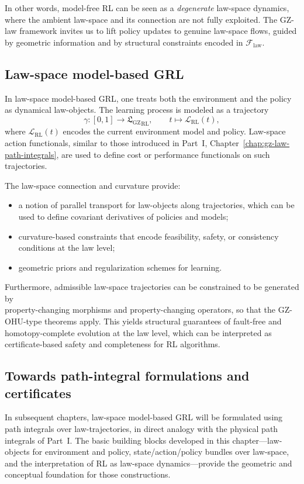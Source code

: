 \documentclass[11pt]{book}
\newcommand{\GZLS}{\ensuremath{\mathfrak{L}_{\mathrm{GZ}}}}
\newcommand{\GZLCurv}{\ensuremath{\mathcal{F}_{\mathrm{law}}}}
\theoremstyle{plain}
\theoremstyle{definition}
\theoremstyle{remark}
\begin{document}
In other words, model-free RL can be seen as a \emph{degenerate}
law-space dynamics, where the ambient law-space and its connection
are not fully exploited. The GZ-law framework invites us to lift
policy updates to genuine law-space flows, guided by geometric
information and by structural constraints encoded in $\GZLCurv$.

\subsection*{Law-space model-based GRL}

In law-space model-based GRL, one treats both the environment and
the policy as dynamical law-objects. The learning process is modeled
as a trajectory
\[
   \gamma \colon [0,1] \longrightarrow {\GZLS}_{\mathrm{RL}},
   \qquad t \longmapsto \mathcal{L}_{\mathrm{RL}}(t),
\]
where $\mathcal{L}_{\mathrm{RL}}(t)$ encodes the current environment
model and policy. Law-space action functionals, similar to those
introduced in Part~I, Chapter~\ref{chap:gz-law-path-integrals}, are
used to define cost or performance functionals on such trajectories.

The law-space connection and curvature provide:
\begin{itemize}
  \item a notion of parallel transport for law-objects along
        trajectories, which can be used to define covariant
        derivatives of policies and models;
  \item curvature-based constraints that encode feasibility,
        safety, or consistency conditions at the law level;
  \item geometric priors and regularization schemes for learning.
\end{itemize}

Furthermore, admissible law-space trajectories can be constrained to
be generated by \\ property-changing morphisms and property-changing
operators, so that the GZ-OHU-type theorems apply. This yields
structural guarantees of fault-free and homotopy-complete evolution
at the law level, which can be interpreted as certificate-based
safety and completeness for RL algorithms.

\subsection*{Towards path-integral formulations and certificates}

In subsequent chapters, law-space model-based GRL will be formulated
using path integrals over law-trajectories, in direct analogy with
the physical path integrals of Part~I. The basic building blocks
developed in this chapter---law-objects for environment and policy,
state/action/policy bundles over law-space, and the interpretation
of RL as law-space dynamics---provide the geometric and conceptual
foundation for those constructions.
\end{document}
